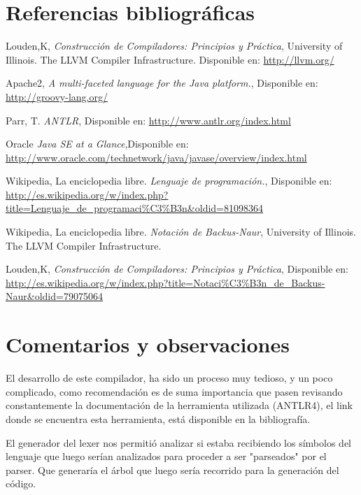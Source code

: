\documentclass[%
 aip,
 jmp,%
 amsmath,amssymb,
 reprint,%
]{revtex4-1}
\begin{document}
\section{Referencias bibliográficas }
\begin{thebibliography}
  Louden,K,
  \emph{Construcción de Compiladores: Principios y Práctica},
  University of Illinois.  The LLVM Compiler Infrastructure.
  Disponible en:  \url {http://llvm.org/} 

  Apache2,
  \emph{A multi-faceted language for the Java platform.},
  Disponible en: \url{http://groovy-lang.org/}  

  Parr, T.
  \emph{ANTLR},
  Disponible en: \url{http://www.antlr.org/index.html} 
  
  
  Oracle
  \emph{Java SE at a Glance},Disponible en:             \url{http://www.oracle.com/technetwork/java/javase/overview/index.html}  
  
  
  Wikipedia, La enciclopedia libre. 
  \emph{Lenguaje de programación.},
  Disponible en: \url{http://es.wikipedia.org/w/index.php?title=Lenguaje_de_programaci\%C3\%B3n&oldid=81098364} 
  
  
  
  
  Wikipedia, La enciclopedia libre. 
  \emph{Notación de Backus-Naur},
  University of Illinois.  The LLVM Compiler Infrastructure. 
  
  Louden,K,
  \emph{Construcción de Compiladores: Principios y Práctica},
  Disponible en: \url{http://es.wikipedia.org/w/index.php?title=Notaci\%C3\%B3n_de_Backus-Naur&oldid=79075064}
  
\end{thebibliography}


\section{Comentarios y observaciones}
El desarrollo de este compilador, ha sido un proceso muy tedioso, y un poco complicado, como recomendación es de suma importancia que pasen revisando constantemente la documentación de la herramienta utilizada (ANTLR4), el link donde se encuentra esta herramienta, está disponible en la bibliografía.

El generador del lexer nos permitió analizar si estaba recibiendo los símbolos del lenguaje que luego serían analizados para proceder a ser "parseados" por el parser. Que generaría el árbol que luego sería recorrido para la generación del código.
\end{document}
